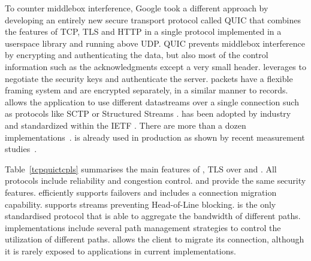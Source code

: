 To counter middlebox interference, Google took a different approach by developing an
entirely new secure transport protocol called QUIC \cite{langley2017quic} that
combines the features of TCP, TLS and HTTP in a single protocol implemented
in a userspace library and running above UDP. QUIC prevents middlebox 
interference
by encrypting and authenticating the data, but also most of the control
information such as the acknowledgments except a very small header. \quic
leverages  \cite{rfc8446} to negotiate the security keys and 
authenticate
the server. \quic packets have a flexible framing system and are 
encrypted separately, in a similar manner to \tls records. \quic allows the
application to use different datastreams over a single
connection such as protocols like
SCTP \cite{rfc4960} or Structured Streams \cite{ford2007structured}.
\quic has
been adopted by industry and standardized within the IETF \cite{rfc9000}.
There are more than a dozen \quic implementations~\cite{quicimplem,marx2020same}. \quic is
already used in production as shown by recent measurement
studies~\cite{trevisan2020five}.

Table~\ref{tcpquictcpls} summarises the main features of \tcp, TLS over \tcp 
and \quic. All protocols include reliability and congestion control. \tls and 
\quic provide the same security features. \mptcp efficiently supports failovers 
and \quic includes a connection migration capability. \quic supports streams 
preventing Head-of-Line blocking. \mptcp is the only 
standardised protocol that is able to aggregate the bandwidth of different 
paths. \mptcp implementations include several path management strategies 
\cite{hesmans2015smapp,hesmans2016enhanced} to control the utilization of 
different paths. \quic allows the client to migrate its 
connection, although it is rarely exposed to applications in current 
implementations.




